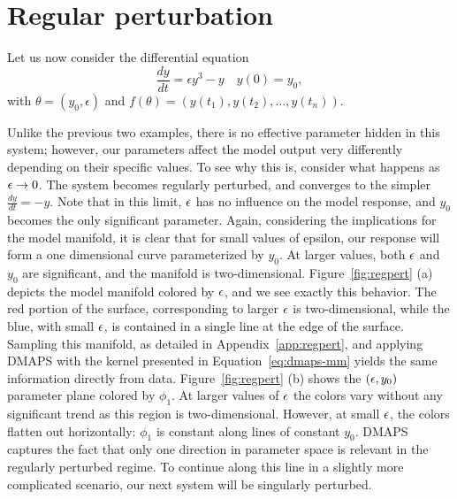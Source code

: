 \section{Regular perturbation}

Let us now consider the differential equation
%
\begin{equation}
  \frac{dy}{dt} = \epsilon y^3 - y
  \quad
  y(0) = y_0 ,
  \label{1D-model-regpert}
\end{equation}
%
with $\theta = (y_0, \epsilon)$ and
$f(\theta) = \left(y(t_1), y(t_2), \dots, y(t_n) \right)$.

Unlike the previous two examples, there is no effective parameter
hidden in this system; however, our parameters affect the model output
very differently depending on their specific values. To see why this
is, consider what happens as $\epsilon \rightarrow 0$. The system becomes
regularly perturbed, and converges to the simpler
$\frac{dy}{dt} = -y$. Note that in this limit, $\epsilon$ has no influence
on the model response, and $y_0$ becomes the only significant
parameter. Again, considering the implications for the model manifold,
it is clear that for small values of epsilon, our response will form a
one dimensional curve parameterized by $y_0$. At larger values, both
$\epsilon$ and $y_0$ are significant, and the manifold is
two-dimensional. Figure~\ref{fig:regpert} (a) depicts the model
manifold colored by $\epsilon$, and we see exactly this behavior. The red
portion of the surface, corresponding to larger $\epsilon$ is
two-dimensional, while the blue, with small $\epsilon$, is contained in a
single line at the edge of the surface. Sampling this manifold, as
detailed in Appendix~\ref{app:regpert}, and applying DMAPS with the
kernel presented in Equation~\ref{eq:dmaps-mm} yields the same
information directly from data. Figure~\ref{fig:regpert} (b) shows the
$(\epsilon, y_0)$ parameter plane colored by $\phi_1$. At larger values of
$\epsilon$ the colors vary without any significant trend as this region is
two-dimensional. However, at small $\epsilon$, the colors flatten out
horizontally: $\phi_1$ is constant along lines of constant
$y_0$. DMAPS captures the fact that only one direction in parameter
space is relevant in the regularly perturbed regime. To continue along
this line in a slightly more complicated scenario, our next system
will be singularly perturbed.

